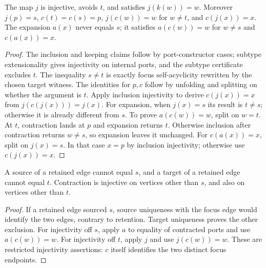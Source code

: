 \begin{lemma}
The map $j$ is injective, avoids $t$, and satisfies $j(k(w))=w$.
Moreover $j(p)=s$, $c(t)=c(s)=p$, $j(c(w))=w$ for $w\ne t$, and $c(j(x))=x$.
The expansion $a(x)$ never equals $s$; it satisfies $a(c(w))=w$ for $w\ne s$
and $c(a(x))=x$.
\end{lemma}
\begin{proof}
The inclusion and keeping claims follow by port-constructor cases; subtype
extensionality gives injectivity on internal ports, and the subtype certificate
excludes $t$. The inequality $s\ne t$ is exactly focus self-acyclicity rewritten
by the chosen target witness. The identities for $p,c$ follow by unfolding and
splitting on whether the argument is $t$. Apply inclusion injectivity to derive
$c(j(x))=x$ from $j(c(j(x)))=j(x)$.
For expansion, when $j(x)=s$ its result is $t\ne s$; otherwise it is already
different from $s$. To prove $a(c(w))=w$, split on $w=t$. At $t$, contraction
lands at $p$ and expansion returns $t$. Otherwise inclusion after contraction
returns $w\ne s$, so expansion leaves it unchanged. For $c(a(x))=x$, split
on $j(x)=s$. In that case $x=p$ by inclusion injectivity; otherwise use
$c(j(x))=x$.
\end{proof}

\begin{lemma}
A source of a retained edge cannot equal $s$, and a target of a retained edge
cannot equal $t$. Contraction is injective on vertices other than $s$, and also
on vertices other than $t$.
\end{lemma}
\begin{proof}
If a retained edge sourced $s$, source uniqueness with the focus edge would
identify the two edges, contrary to retention. Target uniqueness proves the
other exclusion. For injectivity off $s$, apply $a$ to equality of contracted
ports and use $a(c(w))=w$. For injectivity off $t$, apply $j$ and use
$j(c(w))=w$. These are restricted injectivity assertions: $c$ itself identifies
the two distinct focus endpoints.
\end{proof}

